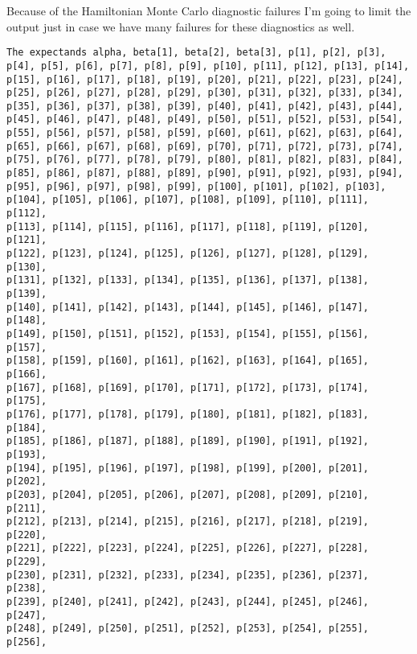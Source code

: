 \documentclass[
  letterpaper,
  DIV=11,
  numbers=noendperiod]{scrartcl}
\newenvironment{Shaded}{\begin{snugshade}}{\end{snugshade}}
\newcommand{\FunctionTok}[1]{\textcolor[rgb]{0.28,0.35,0.67}{#1}}
\newcommand{\NormalTok}[1]{\textcolor[rgb]{0.00,0.23,0.31}{#1}}
\newcommand{\SpecialCharTok}[1]{\textcolor[rgb]{0.37,0.37,0.37}{#1}}
\begin{document}
Because of the Hamiltonian Monte Carlo diagnostic failures I'm going to
limit the output just in case we have many failures for these
diagnostics as well.

\begin{Shaded}
\end{Shaded}

\begin{verbatim}
The expectands alpha, beta[1], beta[2], beta[3], p[1], p[2], p[3],
p[4], p[5], p[6], p[7], p[8], p[9], p[10], p[11], p[12], p[13], p[14],
p[15], p[16], p[17], p[18], p[19], p[20], p[21], p[22], p[23], p[24],
p[25], p[26], p[27], p[28], p[29], p[30], p[31], p[32], p[33], p[34],
p[35], p[36], p[37], p[38], p[39], p[40], p[41], p[42], p[43], p[44],
p[45], p[46], p[47], p[48], p[49], p[50], p[51], p[52], p[53], p[54],
p[55], p[56], p[57], p[58], p[59], p[60], p[61], p[62], p[63], p[64],
p[65], p[66], p[67], p[68], p[69], p[70], p[71], p[72], p[73], p[74],
p[75], p[76], p[77], p[78], p[79], p[80], p[81], p[82], p[83], p[84],
p[85], p[86], p[87], p[88], p[89], p[90], p[91], p[92], p[93], p[94],
p[95], p[96], p[97], p[98], p[99], p[100], p[101], p[102], p[103],
p[104], p[105], p[106], p[107], p[108], p[109], p[110], p[111], p[112],
p[113], p[114], p[115], p[116], p[117], p[118], p[119], p[120], p[121],
p[122], p[123], p[124], p[125], p[126], p[127], p[128], p[129], p[130],
p[131], p[132], p[133], p[134], p[135], p[136], p[137], p[138], p[139],
p[140], p[141], p[142], p[143], p[144], p[145], p[146], p[147], p[148],
p[149], p[150], p[151], p[152], p[153], p[154], p[155], p[156], p[157],
p[158], p[159], p[160], p[161], p[162], p[163], p[164], p[165], p[166],
p[167], p[168], p[169], p[170], p[171], p[172], p[173], p[174], p[175],
p[176], p[177], p[178], p[179], p[180], p[181], p[182], p[183], p[184],
p[185], p[186], p[187], p[188], p[189], p[190], p[191], p[192], p[193],
p[194], p[195], p[196], p[197], p[198], p[199], p[200], p[201], p[202],
p[203], p[204], p[205], p[206], p[207], p[208], p[209], p[210], p[211],
p[212], p[213], p[214], p[215], p[216], p[217], p[218], p[219], p[220],
p[221], p[222], p[223], p[224], p[225], p[226], p[227], p[228], p[229],
p[230], p[231], p[232], p[233], p[234], p[235], p[236], p[237], p[238],
p[239], p[240], p[241], p[242], p[243], p[244], p[245], p[246], p[247],
p[248], p[249], p[250], p[251], p[252], p[253], p[254], p[255], p[256],

\end{verbatim}
\end{document}
